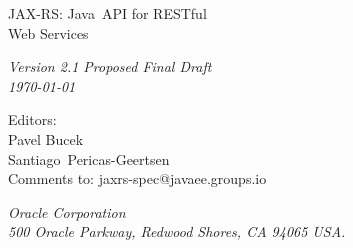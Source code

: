 \begin{titlepage}
\raggedleft

\vspace*{60pt}

{\Huge
\textsf{JAX-RS: Java\texttrademark\ API for RESTful\\\vspace{10pt}
 Web Services}}

\vspace{20pt}

{
\Large\textit{Version 2.1 Proposed Final Draft\\
\today}
}

\vspace{40pt}

{\large Editors:\\
Pavel Bucek\\
Santiago\ Pericas-Geertsen\\
\vspace{10pt}Comments to: jaxrs-spec@javaee.groups.io
}

\vspace{80pt}

{\small\textit{Oracle Corporation\\
500 Oracle Parkway, Redwood Shores, CA 94065 USA.}
}
\end{titlepage} 
